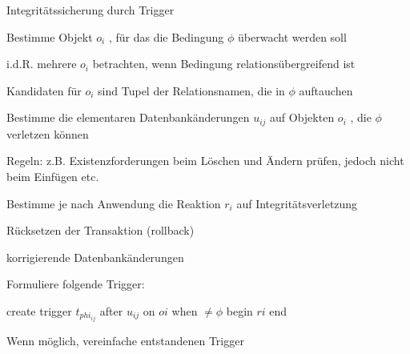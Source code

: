 \documentclass[a4paper]{article}
\begin{document}
\begin{multicols}{3}
\begin{itemize*}
    Integritätssicherung durch Trigger
    \begin{itemize*}
        \item Bestimme Objekt $o_i$ , für das die Bedingung $\phi$ überwacht werden soll
        \begin{itemize*}
            \item i.d.R. mehrere $o_i$ betrachten, wenn Bedingung relationsübergreifend ist
            \item Kandidaten für $o_i$ sind Tupel der Relationsnamen, die in $\phi$ auftauchen
        \end{itemize*}
        \item Bestimme die elementaren Datenbankänderungen $u_{ij}$ auf Objekten $o_i$ , die $\phi$ verletzen können
        \begin{itemize*}
            \item Regeln: z.B. Existenzforderungen beim Löschen und Ändern prüfen, jedoch nicht beim Einfügen etc.
        \end{itemize*}
        \item Bestimme je nach Anwendung die Reaktion $r_i$ auf Integritätsverletzung
        \begin{itemize*}
            \item Rücksetzen der Transaktion (rollback)
            \item korrigierende Datenbankänderungen
        \end{itemize*}
        \item Formuliere folgende Trigger:
        \begin{itemize*}
            \item create trigger $t_{phi_{ij}}$ after $u_{ij}$ on $o i$ when $\neq\phi$ begin $r i$ end
        \end{itemize*}
        \item Wenn möglich, vereinfache entstandenen Trigger
    \end{itemize*}


\end{itemize*}
\end{multicols}
\end{document}
